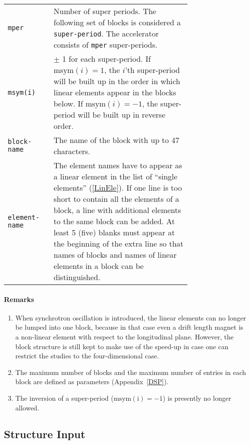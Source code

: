 \bigskip
\begin{longtabu}{@{}lp{0.75\linewidth}}
    \texttt{mper} & Number of super periods. The following set of blocks is considered a \texttt{super-period}. The accelerator consists of \texttt{mper} super-periods. \\
    \texttt{msym(i)} & $\pm$ 1 for each super-period. If $\mathrm{msym}(i)=1$, the \mbox{$i$'th} super-period will be built up in the order in which linear elements appear in the blocks  below. If $\mathrm{msym}(i)=-1$, the super-period will be built up in reverse order. \\
    \texttt{block-name} & The name of the block with up to 47 characters. \\
    \texttt{element-name} & The element names have to appear as a linear element in the list of ``single elements'' (\ref{LinEle}). If one line is too short to contain all the elements of a block, a line with additional elements to the same block can be added. At least 5 (five) blanks must appear at the beginning of the extra line so that names of blocks and names of linear elements in a block can be distinguished.
\end{longtabu}

\paragraph{Remarks}
\begin{enumerate}
    \item When synchrotron oscillation is introduced, the linear elements can no longer be lumped into one block, because in that case even a drift length magnet is a non-linear element with respect to the longitudinal plane. However, the block structure is still kept to make use of the speed-up in case one can restrict the studies to the four-dimensional case.
    \item The maximum number of blocks and the maximum number of entries in each block are defined as parameters (Appendix~\ref{DSP}).
    \item The inversion of a super-period ($\mathrm{msym(i)} = -1$) is presently no longer allowed.
\end{enumerate}

\subsection{Structure Input} \label{StrInp}

